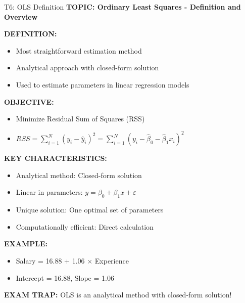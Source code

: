 \documentclass[8pt]{beamer}
\begin{document}
	\begin{frame}{T6: OLS Definition}
		\fontsize{6.5}{7.5}\selectfont
		\textbf{TOPIC: Ordinary Least Squares - Definition and Overview}
		
		\vspace{0.1cm}
		\textbf{DEFINITION:}
		\begin{itemize}
			\item Most straightforward estimation method
			\item Analytical approach with closed-form solution
			\item Used to estimate parameters in linear regression models
		\end{itemize}
		
		\vspace{0.1cm}
		\textbf{OBJECTIVE:}
		\begin{itemize}
			\item Minimize Residual Sum of Squares (RSS)
			\item $RSS = \sum_{i=1}^N (y_i - \hat{y}_i)^2 = \sum_{i=1}^N (y_i - \hat{\beta}_0 - \hat{\beta}_1 x_i)^2$
		\end{itemize}
		
		\vspace{0.1cm}
		\textbf{KEY CHARACTERISTICS:}
		\begin{itemize}
			\item \textcolor{myblue}{Analytical method:} Closed-form solution
			\item \textcolor{myblue}{Linear in parameters:} $y = \beta_0 + \beta_1 x + \varepsilon$
			\item \textcolor{myblue}{Unique solution:} One optimal set of parameters
			\item \textcolor{myblue}{Computationally efficient:} Direct calculation
		\end{itemize}
		
		\vspace{0.1cm}
		\textbf{EXAMPLE:}
		\begin{itemize}
			\item Salary = 16.88 + 1.06 × Experience
			\item Intercept = 16.88, Slope = 1.06
		\end{itemize}
		
		\textcolor{myred}{\textbf{EXAM TRAP:}} OLS is an \textcolor{myblue}{analytical} method with \textcolor{myblue}{closed-form solution}!
	\end{frame}
	
\end{document}
